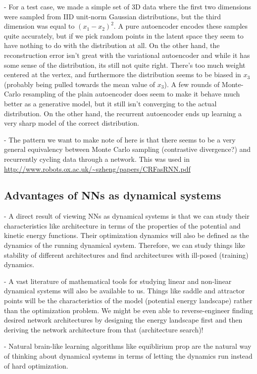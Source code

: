 \documentclass[aps,preprint,showpacs,superscriptaddress,groupedaddress]{revtex4}  %
\begin{document}
- For a test case, we made a simple set of 3D data where the first two dimensions were sampled from IID unit-norm Gaussian distributions, but the third dimension was equal to $(x_1-x_2)^2$. A pure autoencoder encodes these samples quite accurately, but if we pick random points in the latent space they seem to have nothing to do with the distribution at all. On the other hand, the reconstruction error isn’t great with the variational autoencoder and while it has some sense of the distribution, its still not quite right. There’s too much weight centered at the vertex, and furthermore the distribution seems to be biased in $x_3$ (probably being pulled towards the mean value of $x_3$). A few rounds of Monte-Carlo resampling of the plain autoencoder does seem to make it behave much better as a generative model, but it still isn’t converging to the actual distribution. On the other hand, the recurrent autoencoder ends up learning a very sharp model of the correct distribution.

- The pattern we want to make note of here is that there seems to be a very general equivalency between Monte Carlo sampling (contrastive divergence?) and recurrently cycling data through a network. This was used in \url{http://www.robots.ox.ac.uk/~szheng/papers/CRFasRNN.pdf}

\subsection{Advantages of NNs as dynamical systems}
- A direct result of viewing NNs as dynamical systems is that we can study their characteristics like architecture in terms of the properties of the potential and kinetic energy functions. Their optimization dynamics will also be defined as the dynamics of the running dynamical system. Therefore, we can study things like stability of different architectures and find architectures with ill-posed (training) dynamics. 

- A vast literature of mathematical tools for studying linear and non-linear dynamical systems will also be available to us. Things like saddle and attractor points will be the characteristics of the model (potential energy landscape) rather than the optimization problem. We might be even able to reverse-engineer finding desired network architectures by designing the energy landscape first and then deriving the network architecture from that (architecture search)!

- Natural brain-like learning algorithms like equiblirium prop are the natural way of thinking about dynamical systems in terms of letting the dynamics run instead of hard optimization. 
\end{document}
